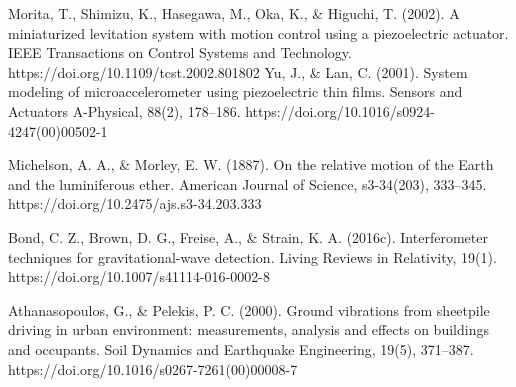 \documentclass[a4paper,11pt]{article} %
\begin{document}
\begin{thebibliography}{99} %
Morita, T., Shimizu, K., Hasegawa, M., Oka, K., \& Higuchi, T. (2002). A miniaturized levitation system with motion control using a piezoelectric actuator. IEEE Transactions on Control Systems and Technology. https://doi.org/10.1109/tcst.2002.801802 
Yu, J., \& Lan, C. (2001). System modeling of microaccelerometer using piezoelectric thin films. Sensors and Actuators A-Physical, 88(2), 178–186. https://doi.org/10.1016/s0924-4247(00)00502-1

Michelson, A. A., \& Morley, E. W. (1887). On the relative motion of the Earth and the luminiferous ether. American Journal of Science, s3-34(203), 333–345. https://doi.org/10.2475/ajs.s3-34.203.333

Bond, C. Z., Brown, D. G., Freise, A., \& Strain, K. A. (2016c). Interferometer techniques for gravitational-wave detection. Living Reviews in Relativity, 19(1). https://doi.org/10.1007/s41114-016-0002-8

Athanasopoulos, G., \& Pelekis, P. C. (2000). Ground vibrations from sheetpile driving in urban environment: measurements, analysis and effects on buildings and occupants. Soil Dynamics and Earthquake Engineering, 19(5), 371–387. https://doi.org/10.1016/s0267-7261(00)00008-7
\end{thebibliography}
\end{document}
